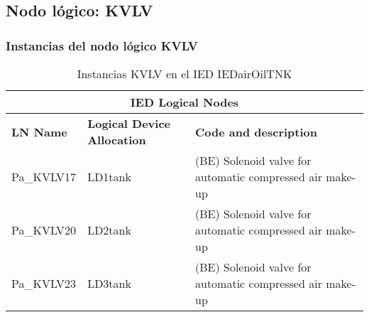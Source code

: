 
\subsection{Nodo l\'ogico: 			 KVLV}

    \subsubsection{Instancias del nodo l\'ogico KVLV}
    \begin{table}[H]
    \begin{center}
    \begin{tabular}{|l|l|p{6.8cm}|}
            \hline
            \multicolumn{3}{|c|}{\cellcolor[gray]{0.8} \textbf{IED Logical Nodes} } \\
            \hline
            \textbf{LN Name} & \textbf{Logical Device Allocation} & \textbf{Code and description} \\
            \hline
            Pa\_KVLV17 & LD1tank & (BE) Solenoid valve for automatic compressed air make-up \\
            \hline
            Pa\_KVLV20 & LD2tank & (BE) Solenoid valve for automatic compressed air make-up \\
            \hline
            Pa\_KVLV23 & LD3tank & (BE) Solenoid valve for automatic compressed air make-up \\
            \hline
    \end{tabular}
    \caption{Instancias KVLV en el IED IEDairOilTNK}
    \label{table:lnInstKVLV_solenoid_operated}
    \end{center}
    \end{table}
    
    
    
